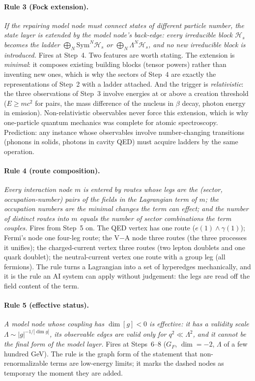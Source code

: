 \paragraph{Rule 3 (Fock extension).} \emph{If the repairing model node must connect states of different particle number, the state layer is extended by the model node's back-edge: every irreducible block $\mathcal H_s$ becomes the ladder $\bigoplus_N \mathrm{Sym}^N\mathcal H_s$ or $\bigoplus_N\Lambda^N\mathcal H_s$, and no new irreducible block is introduced.} Fires at Step~4. Two features are worth stating. The extension is \emph{minimal}: it composes existing building blocks (tensor powers) rather than inventing new ones, which is why the sectors of Step~4 are exactly the representations of Step~2 with a ladder attached. And the trigger is \emph{relativistic}: the three observations of Step~3 involve energies at or above a creation threshold ($E\ge mc^2$ for pairs, the mass difference of the nucleus in $\beta$ decay, photon energy in emission). Non-relativistic observables never force this extension, which is why one-particle quantum mechanics was complete for atomic spectroscopy. Prediction: any instance whose observables involve number-changing transitions (phonons in solids, photons in cavity QED) must acquire ladders by the same operation.

\paragraph{Rule 4 (route composition).} \emph{Every interaction node $m$ is entered by routes whose legs are the (sector, occupation-number) pairs of the fields in the Lagrangian term of $m$; the occupation numbers are the minimal changes the term can effect; and the number of distinct routes into $m$ equals the number of sector combinations the term couples.} Fires from Step~5 on. The QED vertex has one route ($e(1)\wedge\gamma(1)$); Fermi's node one four-leg route; the V$-$A node three routes (the three processes it unifies); the charged-current vertex three routes (two lepton doublets and one quark doublet); the neutral-current vertex one route with a group leg (all fermions). The rule turns a Lagrangian into a set of hyperedges mechanically, and it is the rule an AI system can apply without judgement: the legs are read off the field content of the term.

\paragraph{Rule 5 (effective status).} \emph{A model node whose coupling has $\dim[g]<0$ is effective: it has a validity scale $\Lambda\sim|g|^{-1/|\dim g|}$, its observable edges are valid only for $q^2\ll\Lambda^2$, and it cannot be the final form of the model layer.} Fires at Steps~6--8 ($G_F$, $\dim=-2$, $\Lambda$ of a few hundred GeV). The rule is the graph form of the statement that non-renormalizable terms are low-energy limits; it marks the dashed nodes as temporary the moment they are added.

